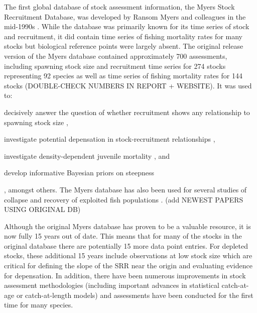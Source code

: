 \documentclass[letterpaper,12pt]{article}
\begin{document}
The first global database of stock assessment information, the Myers
Stock Recruitment Database, was developed by Ransom Myers and
colleagues in the mid-1990s \citep{Myers:etal:1995:summary}.  While the database
was primarily known for its time series of stock and recruitment, it
did contain time series of fishing mortality rates for many stocks but
biological reference points were largely absent. The original release
version of the Myers database \citep{Myers:etal:1995:summary} contained approximately 700 assessments, including spawning stock size and recruitment time series for
274 stocks representing 92 species as well as time series of fishing
mortality rates for 144 stocks (DOUBLE-CHECK NUMBERS IN REPORT +
WEBSITE). It was used to: \begin{inparaenum}[1\upshape)] \item decisively answer the question of whether recruitment shows any
relationship to spawning stock size \citep{Myers:Barrowman:1996:fishbull}, \item investigate potential depensation in stock-recruitment relationships
\citep{Myers:etal:1995:science, Liermann:Hilborn:1997:cjfas}, \item investigate
density-dependent juvenile mortality \citep{Myers:2001:ices,
  Minto:etal:2008:nature}, and \item develop informative Bayesian priors on
steepness \citep{Myers:etal:1999:cjfas, Myers:etal:2002:najfm, Dorn:2002:najfm} \end{inparaenum}, amongst
others.  The Myers database has also been used for several studies of
collapse and recovery of exploited fish populations \citep{Hutchings:2000:nature, Hutchings:2001:jfishb, Hilborn:1997:csiro}. (add NEWEST PAPERS USING ORIGINAL DB)
\citep{Garvey:etal:2009:cjfas}

Although the original Myers database \citep{Myers:etal:1995:summary} has proven
to be a valuable resource, it is now fully 15 years out of date.
This means that for many of the stocks in the original database there
are potentially 15 more data point entries.  For depleted stocks, these additional 15 years
include observations at low stock size which are critical for defining
the slope of the SRR near the origin and evaluating evidence for depensation.  In addition, there have been
numerous improvements in stock assessment methodologies (including important
advances in statistical catch-at-age or catch-at-length models) and
assessments have been conducted for the first time for many species.
\end{document}
